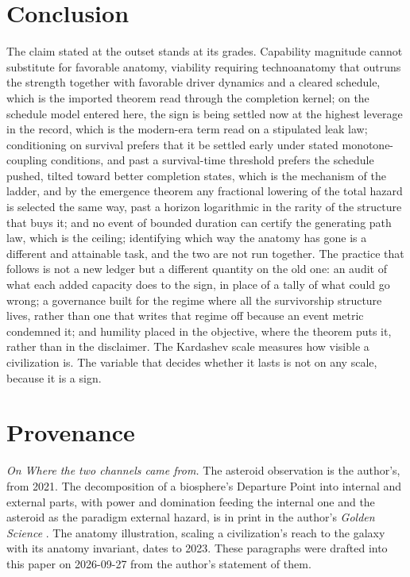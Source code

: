 \section{Conclusion}\label{sec:conclusion}

The claim stated at the outset stands at its grades. Capability
magnitude cannot substitute for favorable anatomy, viability requiring
technoanatomy that outruns the strength together with favorable driver dynamics and a cleared
schedule, which is the imported theorem read through the completion
kernel; on the schedule model entered here, the sign is being settled
now at the highest leverage in the record, which is the modern-era term
read on a stipulated leak law; conditioning on survival prefers that it
be settled early under stated monotone-coupling conditions, and past a
survival-time threshold prefers the schedule pushed, tilted toward
better completion states, which is the mechanism of the ladder, and by
the emergence theorem any fractional lowering of the total
hazard is selected the same way, past a horizon logarithmic in the
rarity of the structure that buys it; and no event of bounded duration can certify the generating path law, which is the ceiling; identifying which way the anatomy has gone is a different and attainable task, and the two are not run together. The
practice that follows is not a new ledger but a different quantity on
the old one: an audit of what each added capacity does to the sign, in
place of a tally of what could go wrong; a governance built for the
regime where all the survivorship structure lives, rather than one that
writes that regime off because an event metric condemned it; and
humility placed in the objective, where the theorem puts it, rather than
in the disclaimer. The Kardashev scale measures how visible a
civilization is. The variable that decides whether it lasts is not on
any scale, because it is a sign.


\section*{Provenance}

\noindent\textit{On Where the two channels came from.} The asteroid observation is the author's, from 2021. The decomposition of a biosphere's Departure Point into internal and external parts, with power and domination feeding the internal one and the asteroid as the paradigm external hazard, is in print in the author's \emph{Golden Science} \cite{GoldenScience2022}. The anatomy illustration, scaling a civilization's reach to the galaxy with its anatomy invariant, dates to 2023. These paragraphs were drafted into this paper on 2026-09-27 from the author's statement of them.

\printbibliography
